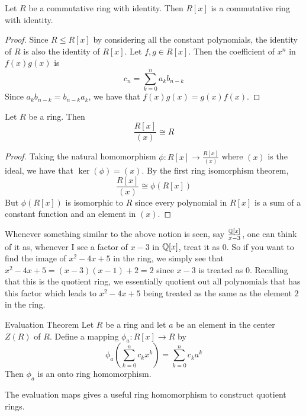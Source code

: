 \documentclass[a4paper]{article}
\begin{document}
\begin{prp}{}{} Let $R$ be a commutative ring with identity. Then $R[x]$ is a commutative ring with identity. \tcbline
\begin{proof}
Since $R\leq R[x]$ by considering all the constant polynomials, the identity of $R$ is also the identity of $R[x]$. Let $f,g\in R[x]$. Then the coefficient of $x^n$ in $f(x)g(x)$ is $$c_n=\sum_{k=0}^na_kb_{n-k}$$ Since $a_kb_{n-k}=b_{n-k}a_k$, we have that $f(x)g(x)=g(x)f(x)$. 
\end{proof}
\end{prp}

\begin{lmm}{}{} Let $R$ be a ring. Then $$\frac{R[x]}{(x)}\cong R$$ \tcbline
\begin{proof}
Taking the natural homomorphism $\phi:R[x]\to\frac{R[x]}{(x)}$ where $(x)$ is the ideal, we have that $\ker(\phi)=(x)$. By the first ring isomorphism theorem, $$\frac{R[x]}{(x)}\cong\phi(R[x])$$ But $\phi(R[x])$ is isomorphic to $R$ since every polynomial in $R[x]$ is a sum of a constant function and an element in $(x)$. 
\end{proof}
\end{lmm}

Whenever something similar to the above notion is seen, say $\frac{\mathbb{Q}[x]}{x-3}$, one can think of it as, whenever I see a factor of $x-3$ in $\mathbb{Q}[x]$, treat it as $0$. So if you want to find the image of $x^2-4x+5$ in the ring, we simply see that $x^2-4x+5=(x-3)(x-1)+2=2$ since $x-3$ is treated as $0$. Recalling that this is the quotient ring, we essentially quotient out all polynomials that has this factor which leads to $x^2-4x+5$ being treated as the same as the element $2$ in the ring. 

\begin{thm}{Evaluation Theorem}{} Let $R$ be a ring and let $a$ be an element in the center $Z(R)$ of $R$. Define a mapping $\phi_a:R[x]\to R$ by $$\phi_a\left(\sum_{k=0}^nc_kx^k\right)=\sum_{k=0}^nc_ka^k$$ Then $\phi_a$ is an onto ring homomorphism. 
\end{thm}

The evaluation maps gives a useful ring homomorphism to construct quotient rings. 
\end{document}
